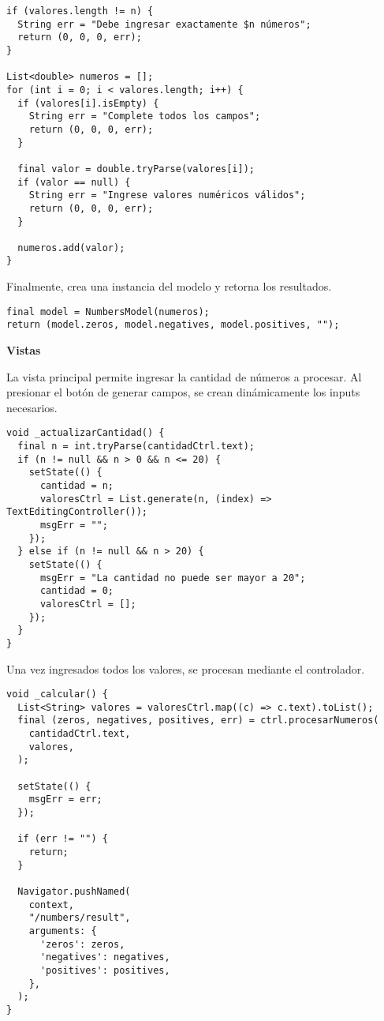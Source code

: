 \begin{center}
\begin{lstlisting}
if (valores.length != n) {
  String err = "Debe ingresar exactamente $n números";
  return (0, 0, 0, err);
}

List<double> numeros = [];
for (int i = 0; i < valores.length; i++) {
  if (valores[i].isEmpty) {
    String err = "Complete todos los campos";
    return (0, 0, 0, err);
  }

  final valor = double.tryParse(valores[i]);
  if (valor == null) {
    String err = "Ingrese valores numéricos válidos";
    return (0, 0, 0, err);
  }

  numeros.add(valor);
}
\end{lstlisting}
\end{center}

Finalmente, crea una instancia del modelo y retorna los resultados.

\begin{center}
\begin{lstlisting}
final model = NumbersModel(numeros);
return (model.zeros, model.negatives, model.positives, "");
\end{lstlisting}
\end{center}

\textbf{Vistas}

La vista principal permite ingresar la cantidad de números a procesar. Al presionar el botón de generar campos, se crean dinámicamente los inputs necesarios.

\begin{center}
\begin{lstlisting}
void _actualizarCantidad() {
  final n = int.tryParse(cantidadCtrl.text);
  if (n != null && n > 0 && n <= 20) {
    setState(() {
      cantidad = n;
      valoresCtrl = List.generate(n, (index) => TextEditingController());
      msgErr = "";
    });
  } else if (n != null && n > 20) {
    setState(() {
      msgErr = "La cantidad no puede ser mayor a 20";
      cantidad = 0;
      valoresCtrl = [];
    });
  }
}
\end{lstlisting}
\end{center}

Una vez ingresados todos los valores, se procesan mediante el controlador.

\begin{center}
\begin{lstlisting}
void _calcular() {
  List<String> valores = valoresCtrl.map((c) => c.text).toList();
  final (zeros, negatives, positives, err) = ctrl.procesarNumeros(
    cantidadCtrl.text,
    valores,
  );

  setState(() {
    msgErr = err;
  });

  if (err != "") {
    return;
  }

  Navigator.pushNamed(
    context,
    "/numbers/result",
    arguments: {
      'zeros': zeros,
      'negatives': negatives,
      'positives': positives,
    },
  );
}
\end{lstlisting}
\end{center}

